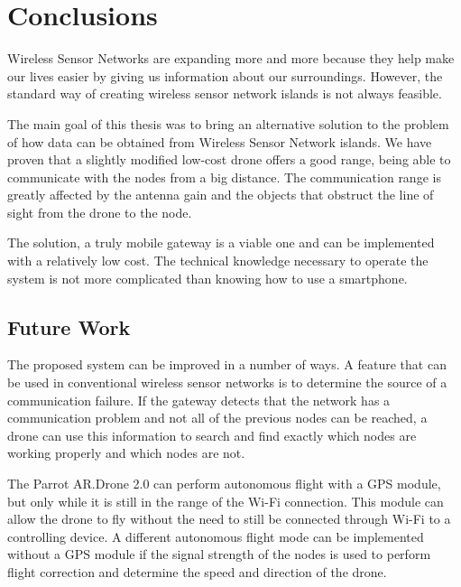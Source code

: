 \chapter{Conclusions}


Wireless Sensor Networks are expanding more and more because they help make our lives easier by giving us information about our surroundings. However, the standard way of creating wireless sensor network islands is not always feasible.

The main goal of this thesis was to bring an alternative solution to the problem of how data can be obtained from Wireless Sensor Network islands. We have proven that a slightly modified low-cost drone offers a good range, being able to communicate with the nodes from a big distance. The communication range is greatly affected by the antenna gain and the objects that obstruct the line of sight from the drone to the node.


The solution, a truly mobile gateway is a viable one and can be implemented with a relatively low cost. The technical knowledge necessary to operate the system is not more complicated than knowing how to use a smartphone.




\section{Future Work}

The proposed system can be improved in a number of ways. A feature that can be used in conventional wireless sensor networks is to determine the source of a communication failure. If the gateway detects that the network has a communication problem and not all of the previous nodes can be reached, a drone can use this information to search and find exactly which nodes are working properly and which nodes are not.

The Parrot AR.Drone 2.0 can perform autonomous flight with a GPS module, but only while it is still in the range of the Wi-Fi connection. This module can allow the drone to fly without the need to still be connected through Wi-Fi to a controlling device. A different autonomous flight mode can be implemented without a GPS module if the signal strength of the nodes is used to perform flight correction and determine the speed and direction of the drone.

